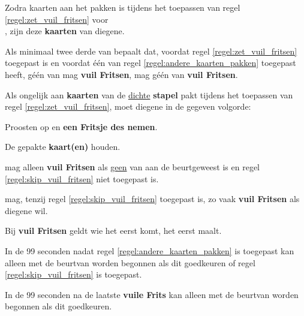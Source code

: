 \vervolgLijst{}
\item Zodra \Frits kaarten aan het pakken is tijdens het toepassen van regel \ref{regel:zet_vuil_fritsen} voor \\ \eenSpelerN, zijn deze \textbf{kaarten} van diegene.  
\eindLijst{}

\vervolgLijst{}
\item Als minimaal twee derde van \alleSpelers bepaalt dat, voordat regel \ref{regel:zet_vuil_fritsen} toegepast is en voordat \'e\'en van \alleSpelers regel \ref{regel:andere_kaarten_pakken} toegepast heeft, géén van \alleSpelers mag \textbf{vuil Fritsen}, mag géén van \alleSpelers \textbf{vuil Fritsen}.
\label{regel:skip_vuil_fritsen}
\eindLijst{}

\vervolgLijst{}
\item Als \eenSpeler ongelijk aan \Frits \textbf{kaarten} van de \ul{dichte} \textbf{stapel} pakt tijdens het toepassen van regel \ref{regel:zet_vuil_fritsen}, moet diegene in de gegeven volgorde:
\puntLijst{}
\item Proosten op  en \textbf{een Fritsje des nemen}\footnotemark[4].
\item De gepakte \textbf{kaart(en)} houden.
\eindPuntLijst{}
\eindLijst{}

\vervolgLijst{}
\item \EenSpeler mag alleen \textbf{vuil Fritsen} als \ul{geen} van \alleSpelers aan de beurt\footnotemark[1] geweest is en regel \ref{regel:skip_vuil_fritsen} niet toegepast is.
\eindLijst{}

\vervolgLijst{}
\item \EenSpeler mag, tenzij regel \ref{regel:skip_vuil_fritsen} toegepast is, zo vaak \textbf{vuil Fritsen} als diegene wil.
\eindLijst{}

\vervolgLijst{}
\item Bij \textbf{vuil Fritsen} geldt wie het eerst komt, het eerst maalt.
\eindLijst{}


\vervolgLijst{}
\item In de 99 seconden nadat regel \ref{regel:andere_kaarten_pakken} is toegepast kan alleen met de beurt\footnotemark[1] van \Willem worden begonnen als \alleSpelers dit goedkeuren of regel \ref{regel:skip_vuil_fritsen} is toegepast.
\label{regel:vuile_frits_1}
\eindLijst{}

\vervolgLijst{}
\item In de 99 seconden na de laatste \textbf{vuile Frits} kan alleen met de beurt\footnotemark[1] van \Willem worden begonnen als \alleSpelers dit goedkeuren.
\label{regel:vuile_frits_2}
\eindLijst{}

